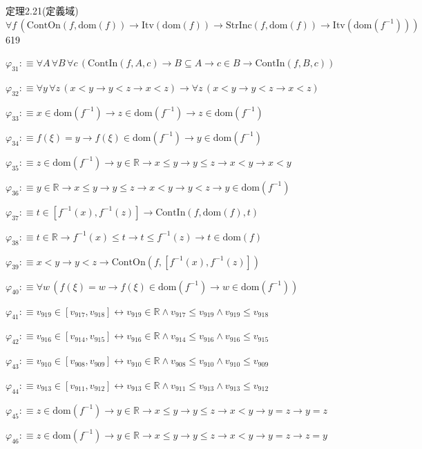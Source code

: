 \begin{fullproof}{定理2.21(定義域)}{$\forall f\,(\mathrm{ContOn}(f,\mathrm{dom}(f)) \to \mathrm{Itv}(\mathrm{dom}(f)) \to \mathrm{StrInc}(f,\mathrm{dom}(f)) \to \mathrm{Itv}(\mathrm{dom}(f^{-1})))$}{619}
\begin{abbrevlist}
\item $\varphi_{31} :\equiv \forall A\,\forall B\,\forall c\,(\mathrm{ContIn}(f,A,c) \to B \subseteq A \to c \in B \to \mathrm{ContIn}(f,B,c))$
\item $\varphi_{32} :\equiv \forall y\,\forall z\,(x < y \to y < z \to x < z) \to \forall z\,(x < y \to y < z \to x < z)$
\item $\varphi_{33} :\equiv x \in \mathrm{dom}(f^{-1}) \to z \in \mathrm{dom}(f^{-1}) \to z \in \mathrm{dom}(f^{-1})$
\item $\varphi_{34} :\equiv f(\xi) = y \to f(\xi) \in \mathrm{dom}(f^{-1}) \to y \in \mathrm{dom}(f^{-1})$
\item $\varphi_{35} :\equiv z \in \mathrm{dom}(f^{-1}) \to y \in \mathbb{R} \to x \leq y \to y \leq z \to x < y \to x < y$
\item $\varphi_{36} :\equiv y \in \mathbb{R} \to x \leq y \to y \leq z \to x < y \to y < z \to y \in \mathrm{dom}(f^{-1})$
\item $\varphi_{37} :\equiv t \in [f^{-1}(x),f^{-1}(z)] \to \mathrm{ContIn}(f,\mathrm{dom}(f),t)$
\item $\varphi_{38} :\equiv t \in \mathbb{R} \to f^{-1}(x) \leq t \to t \leq f^{-1}(z) \to t \in \mathrm{dom}(f)$
\item $\varphi_{39} :\equiv x < y \to y < z \to \mathrm{ContOn}(f,[f^{-1}(x),f^{-1}(z)])$
\item $\varphi_{40} :\equiv \forall w\,(f(\xi) = w \to f(\xi) \in \mathrm{dom}(f^{-1}) \to w \in \mathrm{dom}(f^{-1}))$
\item $\varphi_{41} :\equiv v_{919} \in [v_{917},v_{918}] \leftrightarrow v_{919} \in \mathbb{R} \land v_{917} \leq v_{919} \land v_{919} \leq v_{918}$
\item $\varphi_{42} :\equiv v_{916} \in [v_{914},v_{915}] \leftrightarrow v_{916} \in \mathbb{R} \land v_{914} \leq v_{916} \land v_{916} \leq v_{915}$
\item $\varphi_{43} :\equiv v_{910} \in [v_{908},v_{909}] \leftrightarrow v_{910} \in \mathbb{R} \land v_{908} \leq v_{910} \land v_{910} \leq v_{909}$
\item $\varphi_{44} :\equiv v_{913} \in [v_{911},v_{912}] \leftrightarrow v_{913} \in \mathbb{R} \land v_{911} \leq v_{913} \land v_{913} \leq v_{912}$
\item $\varphi_{45} :\equiv z \in \mathrm{dom}(f^{-1}) \to y \in \mathbb{R} \to x \leq y \to y \leq z \to x < y \to y = z \to y = z$
\item $\varphi_{46} :\equiv z \in \mathrm{dom}(f^{-1}) \to y \in \mathbb{R} \to x \leq y \to y \leq z \to x < y \to y = z \to z = y$

\end{abbrevlist}
\end{fullproof}
